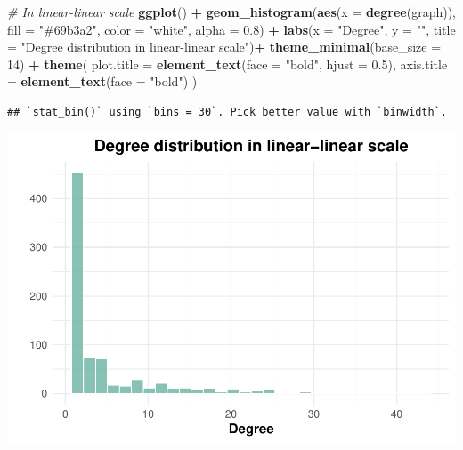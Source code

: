 \documentclass[
]{article}
\newenvironment{Shaded}{\begin{snugshade}}{\end{snugshade}}
\newcommand{\AttributeTok}[1]{\textcolor[rgb]{0.13,0.29,0.53}{#1}}
\newcommand{\CommentTok}[1]{\textcolor[rgb]{0.56,0.35,0.01}{\textit{#1}}}
\newcommand{\DecValTok}[1]{\textcolor[rgb]{0.00,0.00,0.81}{#1}}
\newcommand{\FloatTok}[1]{\textcolor[rgb]{0.00,0.00,0.81}{#1}}
\newcommand{\FunctionTok}[1]{\textcolor[rgb]{0.13,0.29,0.53}{\textbf{#1}}}
\newcommand{\NormalTok}[1]{#1}
\newcommand{\SpecialCharTok}[1]{\textcolor[rgb]{0.81,0.36,0.00}{\textbf{#1}}}
\newcommand{\StringTok}[1]{\textcolor[rgb]{0.31,0.60,0.02}{#1}}
\begin{document}
\begin{Shaded}
\begin{Highlighting}[]
\CommentTok{\# In linear{-}linear scale}
\FunctionTok{ggplot}\NormalTok{() }\SpecialCharTok{+} 
  \FunctionTok{geom\_histogram}\NormalTok{(}\FunctionTok{aes}\NormalTok{(}\AttributeTok{x =} \FunctionTok{degree}\NormalTok{(graph)),}
                 \AttributeTok{fill =} \StringTok{"\#69b3a2"}\NormalTok{, }\AttributeTok{color =} \StringTok{"white"}\NormalTok{, }\AttributeTok{alpha =} \FloatTok{0.8}\NormalTok{) }\SpecialCharTok{+} 
  \FunctionTok{labs}\NormalTok{(}\AttributeTok{x =} \StringTok{"Degree"}\NormalTok{, }\AttributeTok{y =} \StringTok{""}\NormalTok{, }\AttributeTok{title =} \StringTok{"Degree distribution in linear{-}linear scale"}\NormalTok{)}\SpecialCharTok{+}
  \FunctionTok{theme\_minimal}\NormalTok{(}\AttributeTok{base\_size =} \DecValTok{14}\NormalTok{) }\SpecialCharTok{+}
  \FunctionTok{theme}\NormalTok{(}
    \AttributeTok{plot.title =} \FunctionTok{element\_text}\NormalTok{(}\AttributeTok{face =} \StringTok{"bold"}\NormalTok{, }\AttributeTok{hjust =} \FloatTok{0.5}\NormalTok{),}
    \AttributeTok{axis.title =} \FunctionTok{element\_text}\NormalTok{(}\AttributeTok{face =} \StringTok{"bold"}\NormalTok{)}
\NormalTok{  )}
\end{Highlighting}
\end{Shaded}

\begin{verbatim}
## `stat_bin()` using `bins = 30`. Pick better value with `binwidth`.
\end{verbatim}

\includegraphics{export-network_files/figure-latex/unnamed-chunk-8-1.pdf}
\end{document}
